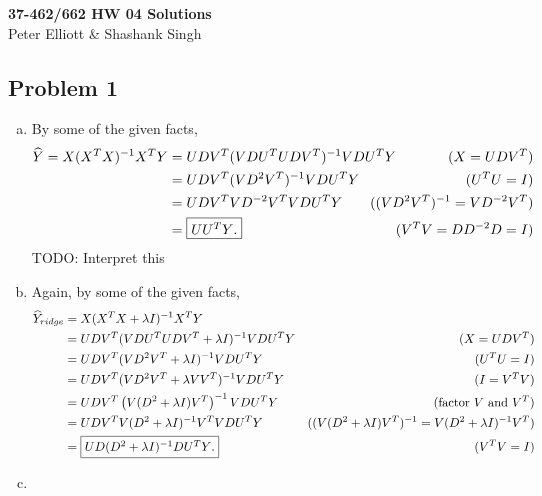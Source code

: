 \documentclass[12pt]{article}
\newcommand{\inv}{^{-1}}                            %
\renewcommand{\hat}{\widehat}
\begin{document}
\begin{center}
{\bf\Large 37-462/662 HW 04 Solutions}\\
Peter Elliott \& Shashank Singh\\
\end{center}

\subsection*{Problem 1}
\begin{enumerate}[(a)]
\item By some of the given facts,
\begin{align}
\notag
\hat Y
    = X (X^T X)\inv X^T Y
 &  = U D V^T (V D U^T U D V^T)\inv V D U^T Y   & (X = U D V^T)                     \\
\notag
 &  = U D V^T (V D^2 V^T)\inv V D U^T Y         & (U^T U = I)                       \\
\notag
 &  = U D V^T V D^{-2} V^T V D U^T Y            & \hspace{-10mm}((V D^2 V^T)\inv = V D^{-2} V^T)  \\
    \label{eq:LR}
 &  = \mbox{\fbox{$U U^T Y$.}}                  & \hspace{-10mm}(V^T V = D D^{-2} D = I)
\end{align}
TODO: Interpret this
\item Again, by some of the given facts,
\begin{align*}
\hat Y_{ridge}
 &  = X (X^T X + \lambda I)\inv X^T Y                                       \\
 &  = U D V^T (V D U^T U D V^T + \lambda I)\inv V D U^T Y   & (X = U D V^T) \\
 &  = U D V^T (V D^2 V^T + \lambda I)\inv V D U^T Y         & (U^T U = I)   \\
 &  = U D V^T (V D^2 V^T + \lambda VV^T)\inv V D U^T Y      & (I = V^T V)   \\
 &  = U D V^T \left( V (D^2 + \lambda I) V^T \right) \inv V D U^T Y
                                                            & (\text{factor $V$ and $V^T$})  \\
 &  = U D V^T V (D^2 + \lambda I)\inv V^T V D U^T Y
            & ((V (D^2 + \lambda I) V^T)\inv = V (D^2 + \lambda I)\inv V^T) \\
 &  = \mbox{\fbox{$U D (D^2 + \lambda I)\inv D U^T Y$.}}    & (V^T V = I)   \\
\end{align*}
\item 
\end{enumerate}
\end{document}
